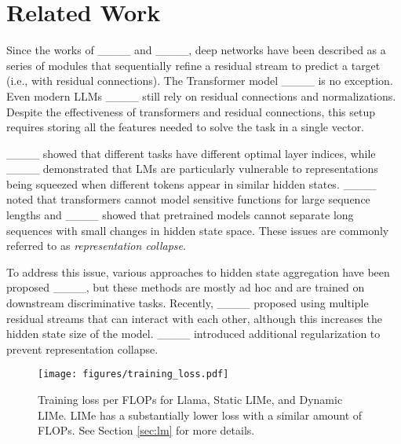 \section{Related Work}
Since the works of ____ and ____, deep networks have been described as a series of modules that sequentially refine a residual stream to predict a target (i.e., with residual connections). The Transformer model ____ is no exception. Even modern LLMs ____ still rely on residual connections and normalizations. Despite the effectiveness of transformers and residual connections, this setup requires storing all the features needed to solve the task in a single vector.

____ showed that different tasks have different optimal layer indices, while ____ demonstrated that LMs are particularly vulnerable to representations being squeezed when different tokens appear in similar hidden states. ____ noted that transformers cannot model sensitive functions for large sequence lengths and ____ showed that pretrained models cannot separate long sequences with small changes in hidden state space. These issues are commonly referred to as \emph{representation collapse}.

To address this issue, various approaches to hidden state aggregation have been proposed ____, but these methods are mostly ad hoc and are trained on downstream discriminative tasks. Recently, ____ proposed using multiple residual streams that can interact with each other, although this increases the hidden state size of the model. ____ introduced additional regularization to prevent representation collapse.


\begin{figure}[t]
    \centering
    \texttt{[image: figures/training\_loss.pdf]}
    \caption{Training loss per FLOPs for Llama, Static LIMe, and Dynamic LIMe. LIMe has a substantially lower loss with a similar amount of FLOPs. See Section \ref{sec:lm} for more details.}
    \label{fig:training_loss}
\end{figure}
